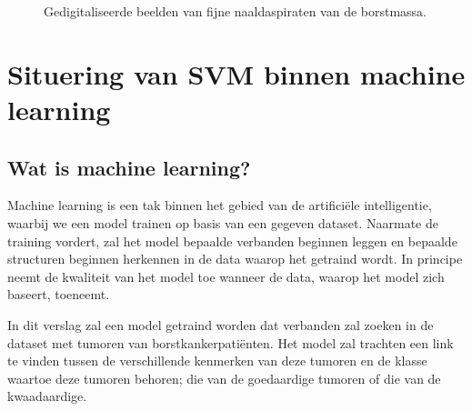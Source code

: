 \documentclass[twoside, kulak]{kulakreport}
\begin{document}
	\begin{figure}
		\hfill
		\hfill
		\hfill
		\hfill
		\caption{Gedigitaliseerde beelden van fijne naaldaspiraten van de borstmassa. \cite{tumoronderzoek}}
		\label{fig:borstscan}
	\end{figure}
	
	\chapter{Situering van SVM binnen machine learning}
	
	\section{Wat is machine learning?}
	
	Machine learning is een tak binnen het gebied van de artificiële intelligentie, waarbij we een model trainen op basis van een gegeven dataset. Naarmate de training vordert, zal het model bepaalde verbanden beginnen leggen en bepaalde structuren beginnen herkennen in de data waarop het getraind wordt. In principe neemt de kwaliteit van het model toe wanneer de data, waarop het model zich baseert, toeneemt.
	
	In dit verslag zal een model getraind worden dat verbanden zal zoeken in de dataset met tumoren van borstkankerpatiënten. Het model zal trachten een link te vinden tussen de verschillende kenmerken van deze tumoren en de klasse waartoe deze tumoren behoren; die van de goedaardige tumoren of die van de kwaadaardige.
	
\end{document}
